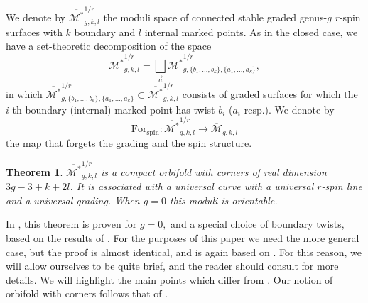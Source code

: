 \documentclass[11pt,a4paper]{article}
\newtheorem{thm}[dummy]{Theorem}
\theoremstyle{definition}
\theoremstyle{remark}
\numberwithin{equation}{section}
\def\Mbar{{\overline{\mathcal M}}}
\def\Mbarstar{{\overline{\mathcal M^*}}}
\begin{document}
We denote by $\Mbarstar_{g,k,l}^{1/r}$ the moduli space of connected stable graded genus-$g$ $r$-spin surfaces with $k$ boundary and $l$ internal marked points.
As in the closed case, we have a set-theoretic decomposition of the space
\[\Mbarstar_{g,k,l}^{1/r} = \bigsqcup_{\vec{a}} \Mbarstar_{g,\{b_1,\ldots,b_k\}, \{a_1,\ldots,a_k\}}^{1/r},\]
in which $\Mbarstar_{g,\{b_1,\ldots,b_k\}, \{a_1,\ldots,a_k\}}^{1/r} \subset \Mbarstar^{1/r}_{g,k,l}$ consists of graded surfaces for which the $i$-th boundary (internal) marked point has twist $b_i$ ($a_i$ resp.).
We denote by \begin{equation}\label{eq for_spin_g}\text{For}_{\text{spin}}:\Mbarstar_{g,k,l}^{1/r}\to\Mbar_{g,k,l}\end{equation} the map that forgets the grading and the spin structure.
\begin{thm}\label{thm:all_g_moduli}
$\Mbarstar_{g,k,l}^{1/r}$ is a compact orbifold with corners of real dimension $3g-3+k+2l$. It is associated with a universal curve with a universal $r$-spin line and a universal grading. When $g=0$ this moduli is orientable.
\end{thm}
In \cite[Theorem 3.4]{BCT1}, this theorem is proven for $g=0,$ and a special choice of boundary twists, based on the results of \cite[Section 2]{Zernik}. For the purposes of this paper we need the more general case, but the proof is almost identical, and is again based on \cite[Section 2]{Zernik}.
For this reason, we will allow ourselves to be quite brief, and the reader should consult for more details. We will highlight the main points which differ from \cite[Theorem 3.4]{BCT1}. Our notion of orbifold with corners follows that of \cite[Section 3]{Zernik}.
\end{document}
